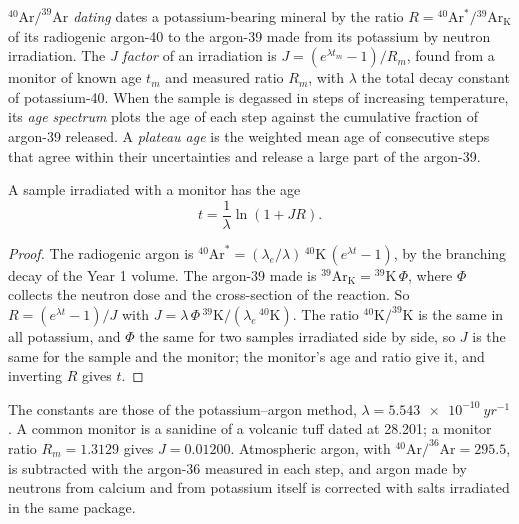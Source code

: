 \begin{definition}
\label{def:b3:advanced-geochronology:arar}
\emph{$^{40}\mathrm{Ar}/^{39}\mathrm{Ar}$ dating}
dates a potassium-bearing mineral by the ratio $R =
{}^{40}\mathrm{Ar}^*/{}^{39}\mathrm{Ar}_{\mathrm K}$ of its radiogenic argon-40
to the argon-39 made from its potassium by neutron irradiation. The
\emph{J factor} of an irradiation is $J = (e^{\lambda
t_m} - 1)/R_m$, found from a monitor of known age $t_m$ and measured ratio
$R_m$, with $\lambda$ the total decay constant of potassium-40. When the sample
is degassed in steps of increasing temperature, its \emph{age
spectrum} plots the age of each step against the
cumulative fraction of argon-39 released. A \emph{plateau
age} is the weighted mean age of consecutive steps that
agree within their uncertainties and release a large part of the argon-39.
\end{definition}

\begin{theorem}\label{thm:b3:advanced-geochronology:arar}
A sample irradiated with a monitor has the age
\[
t = \frac1\lambda\ln(1 + JR).
\]
\end{theorem}

\begin{proof}
The radiogenic argon is $^{40}\mathrm{Ar}^* = (\lambda_e/\lambda)\,
{}^{40}\mathrm{K}\,(e^{\lambda t} - 1)$, by the branching decay of the Year 1
volume. The argon-39 made is $^{39}\mathrm{Ar}_{\mathrm K} =
{}^{39}\mathrm{K}\,\Phi$, where $\Phi$ collects the neutron dose and the
cross-section of the reaction. So $R = (e^{\lambda t} - 1)/J$ with $J =
\lambda\,\Phi\,{}^{39}\mathrm{K}/(\lambda_e\,{}^{40}\mathrm{K})$. The ratio
$^{40}\mathrm{K}/^{39}\mathrm{K}$ is the same in all potassium, and $\Phi$ the
same for two samples irradiated side by side, so $J$ is the same for the sample
and the monitor; the monitor's age and ratio give it, and inverting $R$ gives
$t$.
\end{proof}

The constants are those of the potassium--argon method, $\lambda =
\qty{5.543e-10}{yr^{-1}}$. A common monitor is a sanidine of a volcanic tuff
dated at \qty{28.201}{\Ma}; a monitor ratio $R_m = 1.3129$ gives $J =
0.01200$. Atmospheric argon, with $^{40}\mathrm{Ar}/^{36}\mathrm{Ar} = 295.5$,
is subtracted with the argon-36 measured in each step, and argon made by
neutrons from calcium and from potassium itself is corrected with salts
irradiated in the same package.

